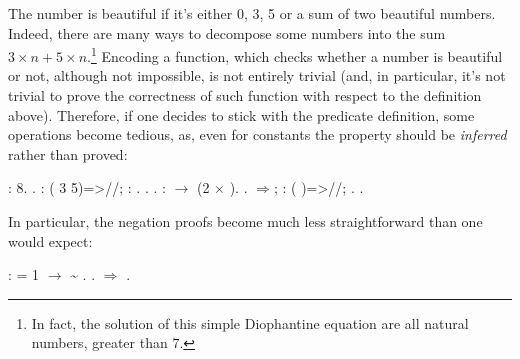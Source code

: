 The number is beautiful  if it's either
0, 3, 5 or a sum of two beautiful numbers. Indeed, there are
many ways to decompose some numbers into the sum $3 \times n + 5
\times n$.\footnote{In fact, the solution of this simple Diophantine
equation are all natural numbers, greater than $7$.} Encoding a
function, which checks whether a number is beautiful or not, although
not impossible, is not entirely trivial (and, in particular, it's not
trivial to prove the correctness of such function with respect to the
definition above). Therefore, if one decides to stick with the
predicate definition, some operations become tedious, as, even for
constants the property should be \textit{inferred} rather than proved:


\begin{coqdoccode}
\coqdocemptyline
\coqdocnoindent
{} :  8.\coqdoceol
\coqdocnoindent
{}.\coqdoceol
\coqdocnoindent
{}: ( \coqdocvar{\_} 3 5)=>//;   : .\coqdoceol
\coqdocnoindent
{}  .\coqdoceol
\coqdocnoindent
{}.\coqdoceol
\coqdocemptyline
\coqdocnoindent
{}  :   \ensuremath{\rightarrow}   (2 \ensuremath{\times} ).\coqdoceol
\coqdocnoindent
{}.\coqdoceol
\coqdocnoindent
{} \ensuremath{\Rightarrow}; : ( \coqdocvar{\_}  )=>//;   .\coqdoceol
\coqdocnoindent
{}.\coqdoceol
\coqdocemptyline
\end{coqdoccode}


In particular, the negation proofs become much less straightforward
than one would expect:


\begin{coqdoccode}
\coqdocemptyline
\coqdocnoindent
{}  :   = 1 \ensuremath{\rightarrow} \textasciitilde {} .\coqdoceol
\coqdocnoindent
{}.\coqdoceol
\coqdocnoindent
{}\ensuremath{\Rightarrow} .\coqdoceol
\coqdocemptyline
\end{coqdoccode}


